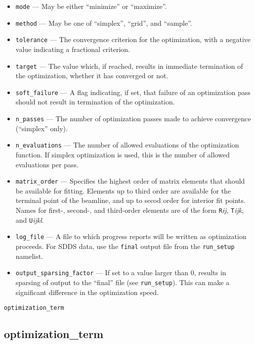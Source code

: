 \documentclass[11pt]{article}
\begin{document}
\begin{itemize}
The equation may be left blank, in which case the user must give one
or more \verb|optimization_term| commands.  These use the same
symbols, of course.

\item \verb|mode| --- May be either ``minimize'' or ``maximize''.
\item \verb|method| --- May be one of ``simplex'', ``grid'', and ``sample''.
\item \verb|tolerance| --- The convergence criterion for the optimization, with a negative value indicating
a fractional criterion.
\item \verb|target| --- The value which, if reached, results in immediate termination of the optimization,
whether it has converged or not.
\item \verb|soft_failure| --- A flag indicating, if set, that failure of an optimization pass should not
result in termination of the optimization.
\item \verb|n_passes| --- The number of optimization passes made to achieve convergence (``simplex'' only).
\item \verb|n_evaluations| --- The number of allowed evaluations of the optimization function.  If simplex
optimization is used, this is the number of allowed evaluations per pass.
\item \verb|matrix_order| --- Specifies the highest order of matrix elements that
should be available for fitting.  Elements up to third order are available for
the terminal point of the beamline, and up to secod order for interior fit points.
Names for first-, second-, and third-order elements are of the form
{\tt R}{\em ij}, {\tt T}{\em ijk}, and {\tt U}{\em ijkl}.
\item \verb|log_file| --- A file to which progress reports will be written as optimization proceeds.
For SDDS data, use the \verb|final| output file from the \verb|run_setup| namelist.
\item \verb|output_sparsing_factor| --- If set to a value larger than 0, results in
sparsing of output to the ``final'' file (see \verb|run_setup|). This can make
a significant difference in the optimization speed.
\end{itemize}

\begin{latexonly}
\newpage
\begin{center}{\Large\verb|optimization_term|}\end{center}
\end{latexonly}
\subsection{optimization\_term}
\end{document}
